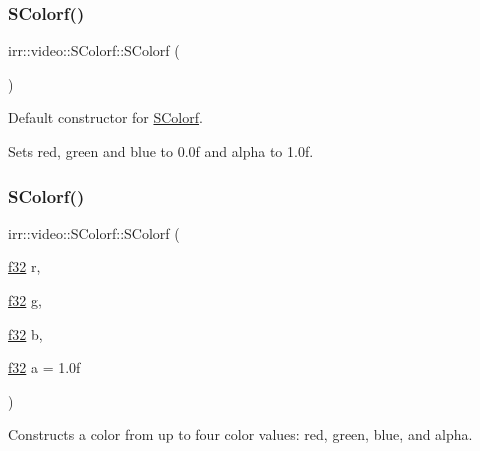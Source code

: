 \subsubsection{\texorpdfstring{S\+Colorf()}{SColorf()}\hspace{0.1cm}{\footnotesize\ttfamily [4/6]}}
{\footnotesize\ttfamily irr\+::video\+::\+S\+Colorf\+::\+S\+Colorf (\begin{DoxyParamCaption}{ }\end{DoxyParamCaption})\hspace{0.3cm}{\ttfamily [inline]}}



Default constructor for \hyperlink{classirr_1_1video_1_1SColorf}{S\+Colorf}. 

Sets red, green and blue to 0.\+0f and alpha to 1.\+0f. \mbox{\label{classirr_1_1video_1_1SColorf_adaf8df839d5174aedba17e61ba28fc64}} 
\subsubsection{\texorpdfstring{S\+Colorf()}{SColorf()}\hspace{0.1cm}{\footnotesize\ttfamily [5/6]}}
{\footnotesize\ttfamily irr\+::video\+::\+S\+Colorf\+::\+S\+Colorf (\begin{DoxyParamCaption}\item[{\hyperlink{namespaceirr_a0277be98d67dc26ff93b1a6a1d086b07}{f32}}]{r,  }\item[{\hyperlink{namespaceirr_a0277be98d67dc26ff93b1a6a1d086b07}{f32}}]{g,  }\item[{\hyperlink{namespaceirr_a0277be98d67dc26ff93b1a6a1d086b07}{f32}}]{b,  }\item[{\hyperlink{namespaceirr_a0277be98d67dc26ff93b1a6a1d086b07}{f32}}]{a = {\ttfamily 1.0f} }\end{DoxyParamCaption})\hspace{0.3cm}{\ttfamily [inline]}}



Constructs a color from up to four color values\+: red, green, blue, and alpha. 


